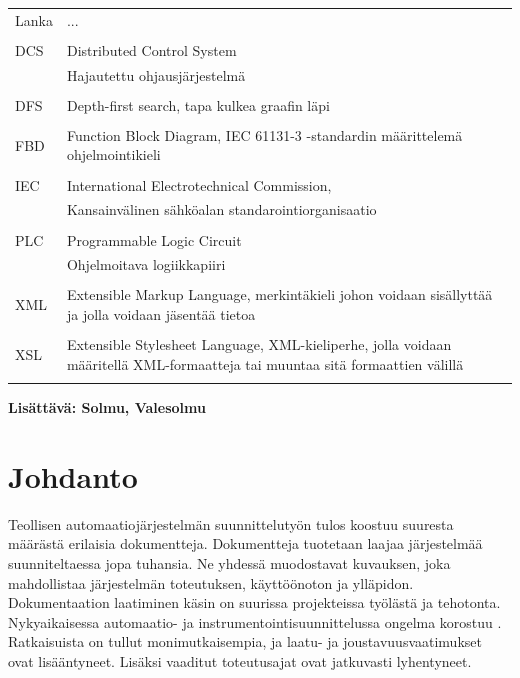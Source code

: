 \documentclass[finnish,12pt]{article}
\begin{document}



	\begin{tabular}{ll}
Lanka	& ... \\\\
	     	    
DCS	& Distributed Control System \\
	& Hajautettu ohjausjärjestelmä \\ \\
DFS	& Depth-first search, tapa kulkea graafin läpi \\\\

FBD	& Function Block Diagram, IEC 61131-3 -standardin määrittelemä ohjelmointikieli\\\\
IEC	& International Electrotechnical Commission,\\
	& Kansainvälinen sähköalan standarointiorganisaatio\\\\
PLC	& Programmable Logic Circuit \\
	& Ohjelmoitava logiikkapiiri\\\\
XML	& Extensible Markup Language, merkintäkieli johon voidaan sisällyttää ja jolla voidaan jäsentää tietoa  \\\\
XSL	& Extensible Stylesheet Language, XML-kieliperhe, jolla voidaan määritellä XML-formaatteja tai muuntaa sitä formaattien välillä \\\\

\end{tabular}

{\bf Lisättävä:
Solmu, Valesolmu
}

	\cleardoublepage
	\storeinipagenumber
	\setcounter{page}{1}


	\section{Johdanto}
	\thispagestyle{empty}

Teollisen automaatiojärjestelmän suunnittelutyön tulos koostuu suuresta määrästä erilaisia dokumentteja.
Dokumentteja tuotetaan laajaa järjestelmää suunniteltaessa jopa tuhansia.
Ne yhdessä muodostavat kuvauksen, joka mahdollistaa järjestelmän toteutuksen, käyttöönoton ja ylläpidon.
Dokumentaation laatiminen käsin on suurissa projekteissa työlästä ja tehotonta.
Nykyaikaisessa automaatio- ja instrumentointisuunnittelussa ongelma korostuu \cite{RefWorks:41}.
Ratkaisuista on tullut monimutkaisempia, ja laatu- ja joustavuusvaatimukset ovat lisääntyneet.
Lisäksi vaaditut toteutusajat ovat jatkuvasti lyhentyneet.
\end{document}
